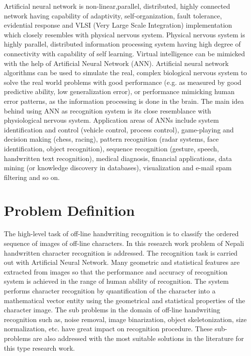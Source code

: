 \documentclass[12pt,a4paper,oneside]{article}
\numberwithin{equation}{section}
\numberwithin{algorithm}{section}
\begin{document}
	Artificial neural network is non-linear,parallel, distributed, highly connected network having capability of adaptivity, self-organization, fault tolerance, evidential response and VLSI (Very Large Scale Integration) implementation which closely resembles with physical nervous system. Physical nervous system is highly parallel, distributed information processing system having high degree of connectivity with capability of self learning. Virtual intelligence can be mimicked with the help of Artificial Neural Network (ANN). Artificial neural network algorithms can be used to simulate the real, complex biological nervous system to solve the real world problems with good performance (e.g. as measured by good predictive ability, low generalization error), or performance mimicking human error patterns, as the information processing is done in the brain. The main idea behind using ANN as recognition system is its close resemblance with physiological nervous system. Application areas of ANNs include system identification and control (vehicle control, process control), game-playing and decision making (chess, racing), pattern recognition (radar systems, face identification, object recognition), sequence recognition (gesture, speech, handwritten text recognition), medical diagnosis, financial applications, data mining (or knowledge discovery in databases), visualization and e-mail spam filtering and so on.
	
	\section{Problem Definition}\label{problem_definition}
	
	The high-level task of off-line handwriting recognition is to classify the ordered sequence of images of off-line characters. In this research work problem of Nepali handwritten character recognition is addressed. The recognition task is carried out with Artificial Neural Network. Many geometric and statistical features are extracted from images so that the performance and accuracy of recognition system is achieved in the range of human ability of recognition. The system performs character recognition by quantification of the character into a mathematical vector entity using the geometrical and statistical properties of the character image.  The sub problems in the domain of off-line handwriting recognition such as, noise removal, image binarization, object skeletonization, size normalization, etc. have great impact on recognition procedure. These sub-problems are also addressed with the most suitable solutions in the literature for this type research work.
	
\end{document}
